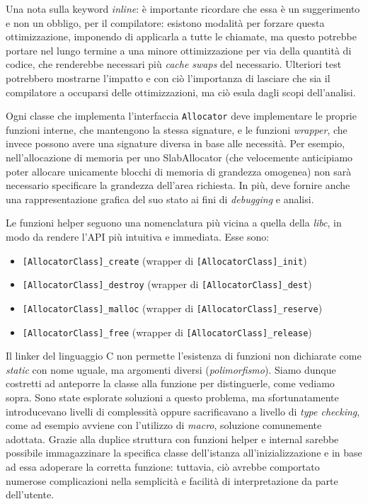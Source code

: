 Una nota sulla keyword \textit{inline}: è importante ricordare che essa è un suggerimento e non un obbligo, per il compilatore: esistono modalità per forzare questa ottimizzazione, imponendo di applicarla a tutte le chiamate, ma questo potrebbe portare nel lungo termine a una minore ottimizzazione per via della quantità di codice, che renderebbe necessari più \textit{cache swaps} del necessario. Ulteriori test potrebbero mostrarne l’impatto e con ciò l’importanza di lasciare che sia il compilatore a occuparsi delle ottimizzazioni, ma ciò esula dagli scopi dell’analisi.

Ogni classe che implementa l’interfaccia \texttt{Allocator} deve implementare le proprie funzioni interne, che mantengono la stessa signature, e le funzioni \textit{wrapper}, che invece possono avere una signature diversa in base alle necessità. Per esempio, nell’allocazione di memoria per uno SlabAllocator (che velocemente anticipiamo poter allocare unicamente blocchi di memoria di grandezza omogenea) non sarà necessario specificare la grandezza dell’area richiesta. In più, deve fornire anche una rappresentazione grafica del suo stato ai fini di \textit{debugging} e analisi.

Le funzioni helper seguono una nomenclatura più vicina a quella della \textit{libc}, in modo da rendere l’API più intuitiva e immediata. Esse sono:
\begin{itemize}
    \item \texttt{[AllocatorClass]\_create} (wrapper di \texttt{[AllocatorClass]\_init})
    \item \texttt{[AllocatorClass]\_destroy} (wrapper di \texttt{[AllocatorClass]\_dest})
    \item \texttt{[AllocatorClass]\_malloc} (wrapper di \texttt{[AllocatorClass]\_reserve})
    \item \texttt{[AllocatorClass]\_free} (wrapper di \texttt{[AllocatorClass]\_release})
\end{itemize}
Il linker del linguaggio C non permette l'esistenza di funzioni non dichiarate come \textit{static} con nome uguale, ma argomenti diversi (\textit{polimorfismo}). Siamo dunque costretti ad anteporre la classe alla funzione per distinguerle, come vediamo sopra. Sono state esplorate soluzioni a questo problema, ma sfortunatamente introducevano livelli di complessità oppure sacrificavano a livello di \textit{type checking}, come ad esempio avviene con l'utilizzo di \textit{macro}, soluzione comunemente adottata. Grazie alla duplice struttura con funzioni helper e internal sarebbe possibile immagazzinare la specifica classe dell'istanza all'inizializzazione e in base ad essa adoperare la corretta funzione: tuttavia, ciò avrebbe comportato numerose complicazioni nella semplicità e facilità di interpretazione da parte dell'utente.

